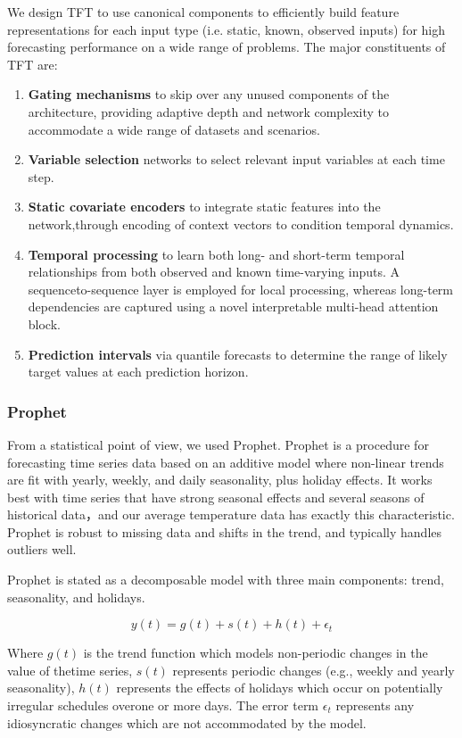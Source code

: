 \documentclass{apmcmthesis}
\begin{document}
We design TFT to use canonical components to efficiently build feature
representations for each input type (i.e. static, known, observed inputs) for high
forecasting performance on a wide range of problems. The major constituents
of TFT are:
\begin{enumerate}
    \item \textbf{Gating mechanisms} to skip over any unused components of the architecture, providing adaptive depth and network complexity to accommodate a wide range of datasets and scenarios. 
    \item \textbf{Variable selection} networks to select relevant input variables at each time step.
    \item \textbf{Static covariate encoders} to integrate static features into the network,through encoding of context vectors to condition temporal dynamics.
    \item \textbf{Temporal processing} to learn both long- and short-term temporal relationships from both observed and known time-varying inputs. A sequenceto-sequence layer is employed for local processing, whereas long-term dependencies are captured using a novel interpretable multi-head attention block.
    \item \textbf{Prediction intervals }via quantile forecasts to determine the range of likely target values at each prediction horizon.
\end{enumerate}
\subsubsection{Prophet}
From a statistical point of view, we used Prophet\cite{3}.
Prophet is a procedure for forecasting time series data based on an additive model where non-linear trends are fit with yearly, weekly, and daily seasonality, plus holiday effects. It works best with time series that have strong seasonal effects and several seasons of historical data，and our average temperature data has exactly this characteristic. Prophet is robust to missing data and shifts in the trend, and typically handles outliers well.

Prophet is stated as a decomposable model with three main components: trend, seasonality, and holidays.

$$
y(t)=g(t)+s(t)+h(t)+\epsilon_t
$$

Where $g(t)$ is the trend function which models non-periodic changes in the value of thetime series, $s(t)$ represents periodic changes (e.g., weekly and yearly seasonality), $h(t)$ represents the effects of holidays which occur on potentially irregular schedules overone or more days. The error term $\epsilon_t$ represents any idiosyncratic changes which are not accommodated by the model.
\end{document}
